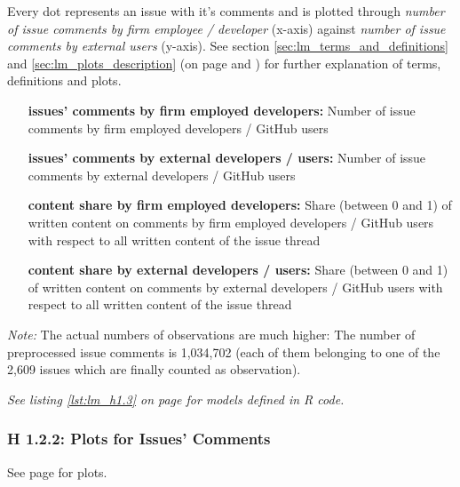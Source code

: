 Every dot represents an issue with it's comments and is plotted through \textit{number of issue comments by firm employee / developer} (x-axis) against \textit{number of issue comments by external users} (y-axis). See section \ref{sec:lm_terms_and_definitions} and \ref{sec:lm_plots_description} (on page \pageref{sec:lm_terms_and_definitions} and \pageref{sec:lm_plots_description}) for further explanation of terms, definitions and plots.

\begin{itemize}
	\item [\textbf{issues' comments by firm employed developers:}] Number of issue comments by firm employed developers / GitHub users
	\item [\textbf{issues' comments by external developers / users:}] Number of issue comments by external developers / GitHub users
	\item [\textbf{content share by firm employed developers:}] Share (between 0 and 1) of written content on comments by firm employed developers / GitHub users with respect to all written content of the issue thread
	\item [\textbf{content share by external developers / users:}] Share (between 0 and 1) of written content on comments by external developers / GitHub users with respect to all written content of the issue thread
\end{itemize}

\textit{Note:} The actual numbers of observations are much higher: The number of preprocessed issue comments is 1,034,702 (each of them belonging to one of the 2,609 issues which are finally counted as observation).

\textit{See listing \ref{lst:lm_h1.3} on page \pageref{lst:lm_h1.3} for models defined in R code.}

\subsubsection{H 1.2.2: Plots for Issues' Comments}

See page \pageref{sec:h_1.2.2_plots} for plots.

\clearpage

